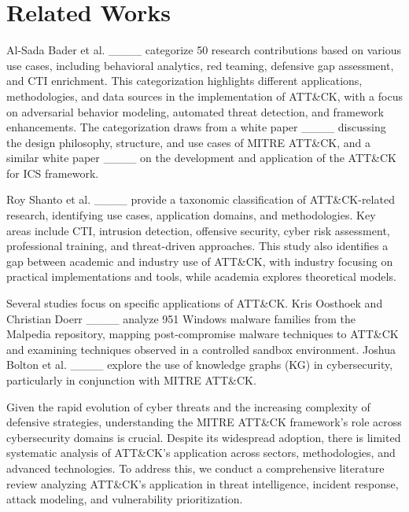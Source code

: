 \section{Related Works}
Al-Sada Bader et al. ____ categorize 50 research contributions based on various use cases, including behavioral analytics, red teaming, defensive gap assessment, and CTI enrichment. This categorization highlights different applications, methodologies, and data sources in the implementation of ATT\&CK, with a focus on adversarial behavior modeling, automated threat detection, and framework enhancements. The categorization draws from a white paper ____ discussing the design philosophy, structure, and use cases of MITRE ATT\&CK, and a similar white paper ____ on the development and application of the ATT\&CK for ICS framework.

Roy Shanto et al. ____ provide a taxonomic classification of ATT\&CK-related research, identifying use cases, application domains, and methodologies. Key areas include CTI, intrusion detection, offensive security, cyber risk assessment, professional training, and threat-driven approaches. This study also identifies a gap between academic and industry use of ATT\&CK, with industry focusing on practical implementations and tools, while academia explores theoretical models.

Several studies focus on specific applications of ATT\&CK. Kris Oosthoek and Christian Doerr ____ analyze 951 Windows malware families from the Malpedia repository, mapping post-compromise malware techniques to ATT\&CK and examining techniques observed in a controlled sandbox environment. Joshua Bolton et al. ____ explore the use of knowledge graphs (KG) in cybersecurity, particularly in conjunction with MITRE ATT\&CK.

Given the rapid evolution of cyber threats and the increasing complexity of defensive strategies, understanding the MITRE ATT\&CK framework's role across cybersecurity domains is crucial. Despite its widespread adoption, there is limited systematic analysis of ATT\&CK’s application across sectors, methodologies, and advanced technologies. To address this, we conduct a comprehensive literature review analyzing ATT\&CK’s application in threat intelligence, incident response, attack modeling, and vulnerability prioritization.